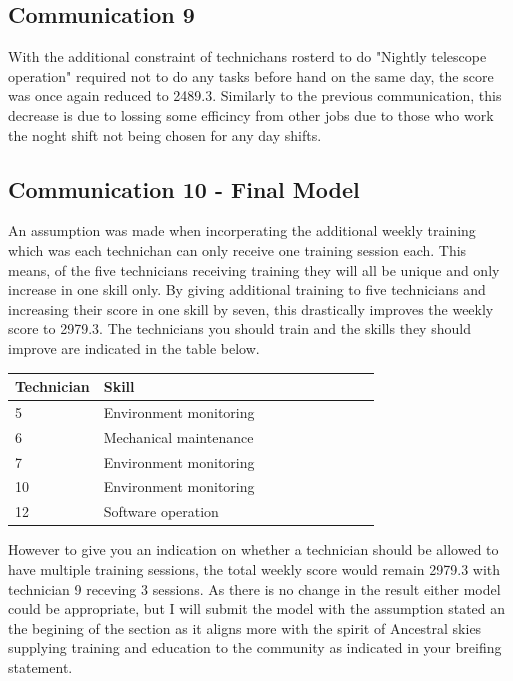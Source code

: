 \documentclass{article}
\begin{document}
\subsection*{Communication 9}
With the additional constraint of technichans rosterd to do "Nightly telescope operation" required not to do
any tasks before hand on the same day, the score was once again reduced to 2489.3.
Similarly to the previous communication, this decrease is due to lossing some efficincy from other
jobs due to those who work the noght shift not being chosen for any day shifts.

\subsection*{Communication 10 - Final Model}
An assumption was made when incorperating the additional weekly training which was each
technichan can only receive one training session each. This means, of the five technicians 
receiving training they will all be unique and only increase in one skill only.
By giving additional training to five technicians and increasing their score in one skill by seven, 
this drastically improves the weekly score to 2979.3. The technicians you should train and the 
skills they should improve are indicated in the table below.

\begin{table}[!ht]
    \centering
    \begin{tabular}{|l|l|l|l|l|l|l|l|l|l|}
    \hline
        Technician & Skill \\ \hline
        5 & Environment monitoring\\ \hline
        6 & Mechanical maintenance\\ \hline
        7 & Environment monitoring\\ \hline
        10 & Environment monitoring\\ \hline
        12 & Software operation\\ \hline
    \end{tabular}
\end{table} 

However to give you an indication on whether a technician should be allowed to have multiple training sessions, the 
total weekly score would remain 2979.3 with technician 9 receving 3 sessions. As there is no change in the result
either model could be appropriate, but I will submit the model with the assumption stated an the begining of the
section as it aligns more with the spirit of Ancestral skies supplying training and education to the community 
as indicated in your breifing statement.\\
\end{document}
